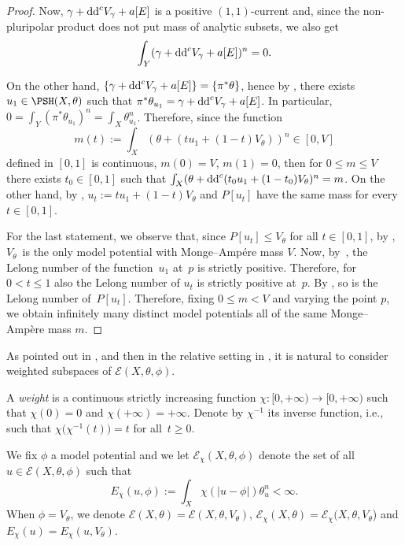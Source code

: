 \begin{proof}
Now, $\gamma+{\rm dd}^c V_\gamma + a[E]$ is a positive $(1,1)$-current and, since the non-pluripolar product does not put mass of analytic subsets, we also get
\[\int_Y ( \gamma +{\rm dd}^c V_\gamma + a[E])^n = 0. \]

On the other hand, $\{\gamma+{\rm dd}^c V_\gamma + a[E]\}= \{ \pi^*\theta \}$, hence by \cite[Proposition 1.2.4]{BouThesis}, there exists~${u_1\in \PSH(X,\theta)}$ such that
$\pi^*\theta_{u_1} = \gamma +{\rm dd}^c V_\gamma + a[E]$.
In particular, $ 0=\int_Y (\pi^*\theta_{u_1})^n =\int_X \theta_{u_1}^n $.
Therefore, since the function
\[m(t) := \int_X ( \theta + (t u_1 + (1-t) V_\theta))^n \in [0, V] \]
defined in $[0,1]$ is continuous, $m(0)=V$, $m(1)=0$, then for $0 \leq m \leq V$ there exists $t_0\in [0,1]$ such that $\int_X (\theta + {\rm dd}^c ( t_0 u_1 + (1-t_0) V_\theta)^n = m$. On the other hand, by \cite[Remark 3.4]{DDL6}, $u_t := tu_1 + (1-t)V_\theta$ and $P[u_t]$ have the same mass for every $t \in [0,1]$.

For the last statement, we observe that, since $P[u_t] \leq V_\theta$ for all $t \in [0,1]$, by \cite[Theorem~3.14]{DDL6}, $V_\theta$~is the only model potential with Monge--Amp\'ere mass $V$. Now, by~\cite[Corollary~1.18]{BouThesis}, the Lelong number of the function~$u_1$ at~$p$ is strictly positive. Therefore, for $0 < t \leq 1$ also the Lelong number of $u_t$ is strictly positive at~$p$. By \cite[Lemma~5.1]{DDL6}, so is the Lelong number of~$P[u_t]$. Therefore, fixing $0 \leq m < V$ and varying the point $p$, we obtain infinitely many distinct model potentials all of the same Monge--Amp\`ere mass $m$.
\end{proof}

As pointed out in \cite{GZ07}, and then in the relative setting in \cite{Gup23}, it is natural to consider weighted subspaces of $\mathcal E(X,\theta,\phi)$.

A \emph{weight} is a continuous strictly increasing function $\chi\colon [0,+\infty) \rightarrow [0,+\infty)$ such that $\chi(0)=0$ and $\chi(+\infty)=+\infty$. Denote by $\chi^{-1}$ its inverse function, i.e., such that $\chi\big(\chi^{-1}(t)\big)= t$ for all~${t\geq 0}$.

We fix $\phi$ a model potential and we let $\mathcal{E}_{\chi}(X,\theta,\phi)$ denote the set of all $u\in \mathcal{E}(X,\theta,\phi)$ such that
\[
E_{\chi}(u,\phi):=\int_X \chi(|u-\phi|) \theta_u^n <\infty.
\]
When $\phi=V_{\theta}$, we denote $\mathcal{E}(X,\theta)=\mathcal{E}(X,\theta,V_{\theta})$, $\mathcal{E}_{\chi}(X,\theta)=\mathcal{E}_{\chi}(X,\theta,V_{\theta}$) and $E_{\chi}(u)=E_{\chi}(u,V_{\theta})$.

